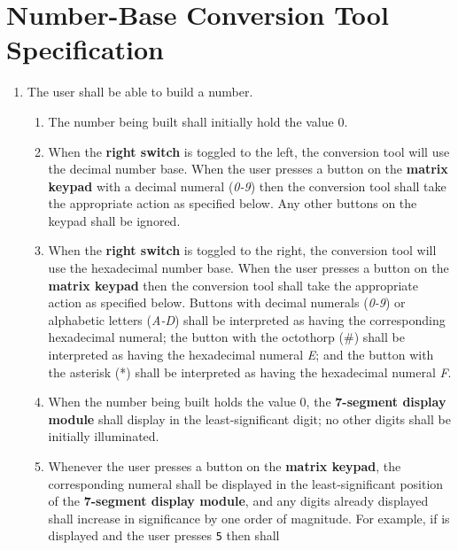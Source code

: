 \section{Number-Base Conversion Tool Specification} \label{sec:FunctionalSpecification}

\begin{enumerate}
\item The user shall be able to build a number.
    \begin{enumerate}
    \item \label{spec:initallyZero} The number being built shall initially hold the
        value 0.
    \item \label{spec:decimalExplained} When the \textbf{right switch} is
        toggled to the left, the conversion tool will use the decimal number
        base. When the user presses a button on the \textbf{matrix keypad} with
        a decimal numeral (\textit{0-9}) then the conversion tool shall take the
        appropriate action as specified below. Any other buttons on the keypad
        shall be ignored.
    \item \label{spec:hexadecimalExplained} When the \textbf{right switch} is
        toggled to the right, the conversion tool will use the hexadecimal
        number base. When the user presses a button on the \textbf{matrix
        keypad} then the conversion tool shall take the appropriate action as
        specified below. Buttons with decimal numerals (\textit{0-9}) or
         alphabetic letters (\textit{A-D}) shall be interpreted as having the
         corresponding hexadecimal numeral; the button with the octothorp (\#)
         shall be interpreted as having the hexadecimal numeral \textit{E}; and
         the button with the asterisk (*) shall be interpreted as having the
         hexadecimal numeral \textit{F}.
    \item \label{spec:displayZero} When the number being built holds the value 0,
        the \textbf{7-segment display module} shall display {} in the
        least-significant digit; no other digits shall be initially illuminated.
    \item \label{spec:BuildingValue} Whenever the user presses a button on the
        \textbf{matrix keypad}, the corresponding numeral shall be displayed in
        the least-significant position of the \textbf{7-segment display
        module}, and any digits already displayed shall increase in
        significance by one order of magnitude. For example, if {}
        is displayed and the user presses \texttt{5} then {} shall

\end{enumerate}
\end{enumerate}
